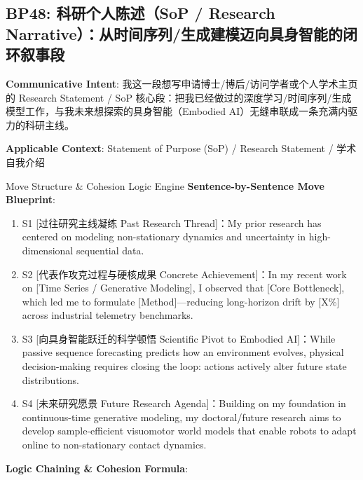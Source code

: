 \subsection{BP48: 科研个人陈述（SoP / Research Narrative）：从时间序列/生成建模迈向具身智能的闭环叙事段}\label{sec:bp:BP48}
\noindent\textbf{\color{AcadNavy}Communicative Intent}: 我这一段想写申请博士/博后/访问学者或个人学术主页的 Research Statement / SoP 核心段：把我已经做过的深度学习/时间序列/生成模型工作，与我未来想探索的具身智能（Embodied AI）无缝串联成一条充满内驱力的科研主线。\par\vspace{2pt}
\noindent\textbf{\color{AcadSlate}Applicable Context}: Statement of Purpose (SoP) / Research Statement / 学术自我介绍\par\vspace{4pt}
\begin{ConceptBox}{Move Structure \& Cohesion Logic Engine}
\textbf{Sentence-by-Sentence Move Blueprint}:
\begin{enumerate}[label=\textbf{\color{AcadNavy}S\arabic*.}, leftmargin=2em, itemsep=2pt]
  \item S1 [过往研究主线凝练 Past Research Thread]：My prior research has centered on modeling non-stationary dynamics and uncertainty in high-dimensional sequential data.
  \item S2 [代表作攻克过程与硬核成果 Concrete Achievement]：In my recent work on [Time Series / Generative Modeling], I observed that [Core Bottleneck], which led me to formulate [Method]---reducing long-horizon drift by [X\%] across industrial telemetry benchmarks.
  \item S3 [向具身智能跃迁的科学顿悟 Scientific Pivot to Embodied AI]：While passive sequence forecasting predicts how an environment evolves, physical decision-making requires closing the loop: actions actively alter future state distributions.
  \item S4 [未来研究愿景 Future Research Agenda]：Building on my foundation in continuous-time generative modeling, my doctoral/future research aims to develop sample-efficient visuomotor world models that enable robots to adapt online to non-stationary contact dynamics.
\end{enumerate}\par\vspace{4pt}
\textbf{Logic Chaining \& Cohesion Formula}:\par{}
\end{ConceptBox}
